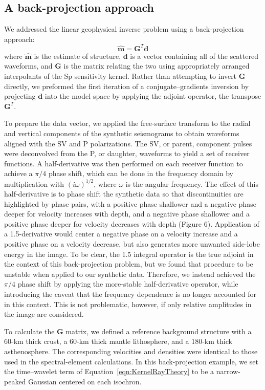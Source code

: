 \documentclass[referee]{gji}
\begin{document}
\subsection{A back-projection approach}

We addressed the linear geophysical inverse problem using a back-projection approach:
$$
\hat{ \textbf{m}} = \textbf{G}^T \textbf{d}
$$
where $\hat{ \textbf{m}}$ is the estimate of structure, $\textbf{d}$ is a vector containing all of the scattered waveforms, and $\textbf{G}$ is the matrix relating the two using appropriately arranged interpolants of the Sp sensitivity kernel.
Rather than attempting to invert $\textbf{G}$ directly, we preformed the first iteration of a conjugate--gradients inversion by projecting $\textbf{d}$ into the model space by applying the adjoint operator, the transpose $\textbf{G}^T$.

To prepare the data vector, we applied the free-surface transform to the radial and vertical components of the synthetic seismograms to obtain waveforms aligned with the SV and P polarizations.  The SV, or parent, component pulses were deconvolved from the P, or daughter, waveforms to yield a set of receiver functions.  A half-derivative was then performed on each receiver function to achieve a $\pi/4$ phase shift, which can be done in the frequency domain by multiplication with $(i\omega)^{1/2}$, where $\omega$ is the angular frequency.  The effect of this half-derivative is to phase shift the synthetic data so that discontinuities are highlighted by phase pairs, with a positive phase shallower and a negative phase deeper for velocity increases with depth, and a negative phase shallower and a positive phase deeper for velocity decreases with depth (Figure 6).  Application of a 1.5-derivative would center a negative phase on a velocity increase and a positive phase on a velocity decrease, but also generates more unwanted side-lobe energy in the image.  To be clear, the 1.5 integral operator is the true adjoint in the context of this back-projection problem, but we found that procedure to be unstable when applied to our synthetic data.  Therefore, we instead achieved the $\pi/4$ phase shift by applying the more-stable half-derivative operator, while introducing the caveat that the frequency dependence is no longer accounted for in this context.  This is not problematic, however, if only relative amplitudes in the image are considered.

To calculate the $\textbf{G}$ matrix, we defined a reference background structure with a 60-km thick crust, a 60-km thick mantle lithosphere, and a 180-km thick asthenosphere.  The corresponding velocities and densities were identical to those used in the spectral-element calculations.  In this back-projection example, we set the time--wavelet term of Equation~\ref{eqn:KernelRayTheory} to be a narrow-peaked Gaussian centered on each isochron.
\end{document}
